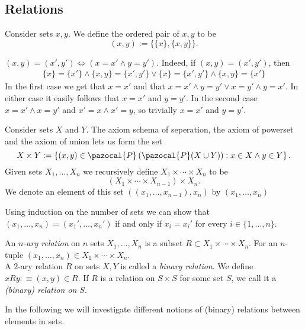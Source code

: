 \subsection{Relations}
\begin{definition}
    Consider sets $x,y$. We define the ordered pair of $x,y$ to be 
    $$(x,y) := \{\{x\},\{x,y\}\}.$$
\end{definition}
\begin{remark}
    $(x,y)=(x',y')\iff (x=x' \wedge y=y')$. Indeed, if $(x,y)=(x',y')$, then 
    \begin{gather*} \{x\} = \{x'\} \wedge \{x,y\} = \{x',y'\} \vee \{x\} = \{x',y'\} \wedge \{x,y\} = \{x'\} 
    \end{gather*}
    In the first case we get that $x=x'$ and that $x=x' \wedge y = y'\vee x= y'\wedge y=x'$. In either case it easily follows that $x=x'$ and $y=y'$. In the second case $x=x' \wedge x=y'$ and $x' = x\wedge x' = y$, so trivially $x=x'$ and $y=y'$. 
\end{remark}
\begin{definition}
    Consider sets $X$ and $Y$. The axiom schema of seperation, the axiom of powerset and the axiom of union lets us form the set
    $$X\times Y := \left\{ (x,y)\in \pazocal{P}\left(\pazocal{P}(X\cup Y)\right) : x\in X \wedge y\in Y\right\}.$$ 
    Given sets $X_1,\dots,X_n$ we recursively define $X_1\times \cdots \times X_n$ to be 
    $$(X_1\times \cdots \times X_{n-1})\times X_n.$$
    We denote an element of this set $((x_1,\dots,x_{n-1}),x_n)$ by $(x_1,\dots,x_n)$
\end{definition}
\begin{remark}
    Using induction on the number of sets we can show that $(x_1,\dots,x_n)=(x_1',\dots,x_n')$ if and only if $x_i=x_i'$ for every $i\in\{1,\dots,n\}$.  
\end{remark}
\begin{definition}
    An \textit{$n$-ary relation} on $n$ sets $X_1,\dots,X_n$ is a subset $R\subset X_1\times \cdots\times X_n$. For an $n$-tuple $(x_1,\dots,x_n)\in X_1\times\cdots\times  X_n$.\\ 
    A $2$-ary relation $R$ on sets $X,Y$ is called a \textit{binary relation}. We define $xRy: \equiv (x,y)\in R$. If $R$ is a relation on $S\times S$ for some set $S$, we call it a \textit{(binary) relation on $S$}.
\end{definition}
In the following we will investigate different notions of (binary) relations between elements in sets. 
